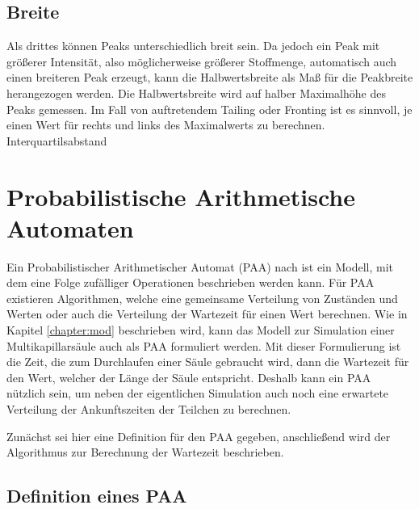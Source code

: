 \subsection{Breite}
Als drittes können Peaks unterschiedlich breit sein. Da jedoch ein Peak mit größerer Intensität, also möglicherweise größerer Stoffmenge, automatisch auch einen breiteren Peak erzeugt, kann die Halbwertsbreite als Maß für die Peakbreite herangezogen werden. Die Halbwertsbreite wird auf halber Maximalhöhe des Peaks gemessen. Im Fall von auftretendem Tailing oder Fronting ist es sinnvoll, je einen Wert für rechts und links des Maximalwerts zu berechnen.
 Interquartilsabstand 

\section{Probabilistische Arithmetische Automaten}
Ein Probabilistischer Arithmetischer Automat (PAA) nach \cite{MHKR} ist ein Modell, mit dem eine Folge zufälliger Operationen beschrieben werden kann. 
Für PAA existieren Algorithmen, welche eine gemeinsame Verteilung von Zuständen und Werten oder auch die Verteilung der Wartezeit für einen Wert berechnen. Wie in Kapitel \ref{chapter:mod} beschrieben wird, kann das Modell zur Simulation einer Multikapillarsäule auch als PAA formuliert werden. Mit dieser Formulierung ist die Zeit, die zum Durchlaufen einer Säule gebraucht wird, dann die Wartezeit für den Wert, welcher der Länge der Säule entspricht. Deshalb kann ein PAA nützlich sein, um neben der eigentlichen Simulation auch noch eine erwartete Verteilung der Ankunftszeiten der Teilchen zu berechnen. 

Zunächst sei hier eine Definition für den PAA gegeben, anschließend wird der Algorithmus zur Berechnung der Wartezeit beschrieben.


\subsection{Definition eines PAA}

